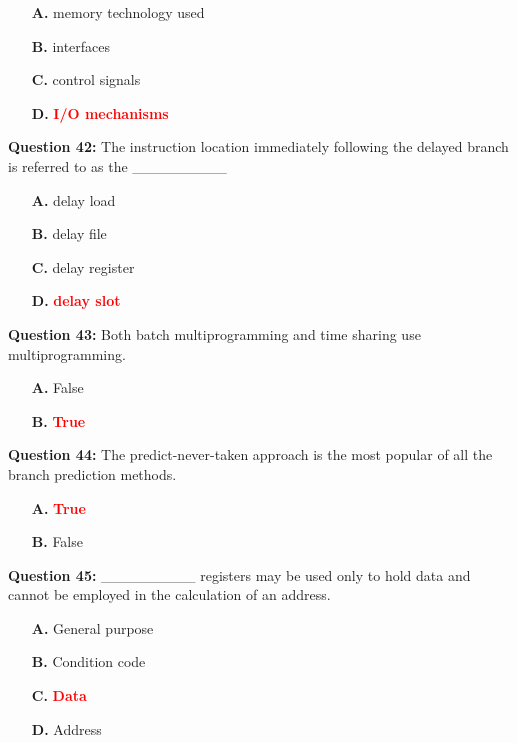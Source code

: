 \documentclass[12pt,a4paper]{article}
\begin{document}
\begin{itemize}
    \item[\textbf{A.}] memory technology used
    \item[\textbf{B.}] interfaces
    \item[\textbf{C.}] control signals
    \item[\textbf{D.}] \textcolor{red}{\textbf{I/O mechanisms}}
\end{itemize}

\vspace{0.5cm}

\textbf{Question 42:} The instruction location immediately following the delayed branch is referred to as the _________

\begin{itemize}
    \item[\textbf{A.}] delay load
    \item[\textbf{B.}] delay file
    \item[\textbf{C.}] delay register
    \item[\textbf{D.}] \textcolor{red}{\textbf{delay slot}}
\end{itemize}

\vspace{0.5cm}

\textbf{Question 43:} Both batch multiprogramming and time sharing use multiprogramming.

\begin{itemize}
    \item[\textbf{A.}] False
    \item[\textbf{B.}] \textcolor{red}{\textbf{True}}
\end{itemize}

\vspace{0.5cm}

\textbf{Question 44:} The predict-never-taken approach is the most popular of all the branch prediction methods.

\begin{itemize}
    \item[\textbf{A.}] \textcolor{red}{\textbf{True}}
    \item[\textbf{B.}] False
\end{itemize}

\vspace{0.5cm}

\textbf{Question 45:} _________ registers may be used only to hold data and cannot be employed in the calculation of an address.

\begin{itemize}
    \item[\textbf{A.}] General purpose
    \item[\textbf{B.}] Condition code
    \item[\textbf{C.}] \textcolor{red}{\textbf{Data}}
    \item[\textbf{D.}] Address
\end{itemize}
\end{document}
